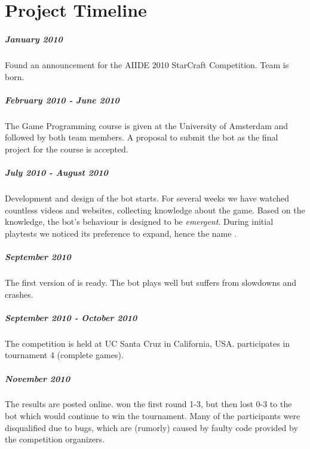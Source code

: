 
\chapter{Project Timeline}
\label{chap:timeline}

\paragraph{January 2010}
Found an announcement for the AIIDE 2010 StarCraft Competition. Team \massexpand is born.

\paragraph{February 2010 - June 2010}
The Game Programming course is given at the University of Amsterdam and followed by both team members. A proposal to submit the bot as the final project for the course is accepted.

\paragraph{July 2010 - August 2010}
Development and design of the bot starts. For several weeks we have watched countless videos and websites, collecting knowledge about the game. Based on the knowledge, the bot's behaviour is designed to be \emph{emergent}. During initial playtests we noticed its preference to expand, hence the name \massexpand.

\paragraph{September 2010}
The first version of \massexpand is ready. The bot plays well but suffers from slowdowns and crashes.

\paragraph{September 2010 - October 2010}
The competition is held at UC Santa Cruz in California, USA. \massexpand participates in tournament 4 (complete games).

\paragraph{November 2010}
The results are posted online. \massexpand won the first round 1-3, but then lost 0-3 to the bot which would continue to win the tournament. Many of the participants were disqualified due to bugs, which are (rumorly) caused by faulty code provided by the competition organizers.

